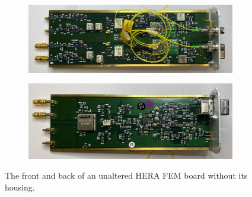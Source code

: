 \begin{figure}
    \centering
    \begin{subfigure}{\textwidth}
        \includegraphics[width=\textwidth]{fem_top.jpg}
    \end{subfigure}
    \vspace{.5cm}
    \begin{subfigure}{\textwidth}
        \includegraphics[width=\textwidth]{fem_bottom.jpg}
    \end{subfigure}
    \caption{The front and back of an unaltered HERA FEM board without its housing.}
    \label{fig:fem}
\end{figure}

\newpage\null\thispagestyle{empty}\newpage

